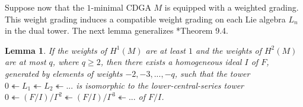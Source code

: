 \documentclass[11pt]{amsart}
\newtheorem{lemma}[theorem]{Lemma}
\theoremstyle{definition}
\numberwithin{equation}{section}
\numberwithin{equation}{section}
\begin{document}
Suppose now that the $1$-minimal CDGA $M$ is equipped with a weighted grading. This weight grading induces a compatible weight grading on each Lie algebra $L_n$ in the dual tower. The next lemma generalizes \cite{Morgan-hodge-theory}*{Theorem 9.4}.

\begin{lemma}\label{Lem: weighted minimal model and Lie algebra tower}
If the weights of $H^{1}(M)$ are at least $1$ and the weights of $H^2(M)$ are at most $q$, where $q\geq 2$, then there exists a homogeneous ideal $I$ of $F$, generated by elements of weights $-2,-3,...,-q$, such that the tower $0\twoheadleftarrow L_1\twoheadleftarrow L_2\twoheadleftarrow ...$ is isomorphic to the lower-central-series tower $0\twoheadleftarrow (F/I)/\Gamma^{2}\twoheadleftarrow (F/I)/\Gamma^{3}\twoheadleftarrow ...$ of $F/I$. 
\end{lemma}
\end{document}
